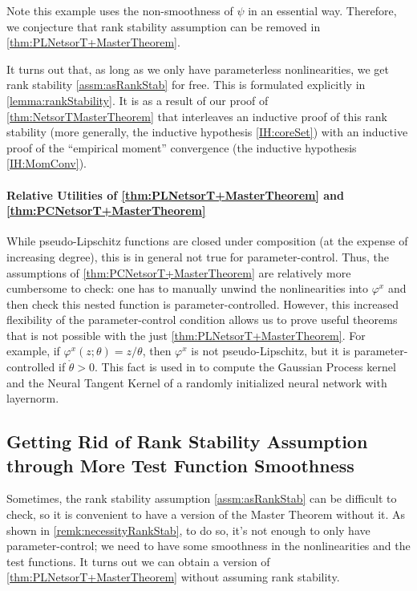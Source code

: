 \documentclass[main.tex]{subfiles}
\begin{document}
Note this example uses the non-smoothness of $\psi$ in an essential way.
Therefore, we conjecture that rank stability assumption can be removed in \cref{thm:PLNetsorT+MasterTheorem}.

\begin{rem}
 \label{remk:rankStabilityNetsor} It turns out that, as long as we only have parameterless nonlinearities, we get rank stability \cref{assm:asRankStab} for free. This is formulated explicitly in \cref{lemma:rankStability}. It is as a result of our proof of \cref{thm:NetsorTMasterTheorem} that interleaves an inductive proof of this rank stability (more generally, the inductive hypothesis \ref{IH:coreSet}) with an inductive proof of the ``empirical moment'' convergence (the inductive hypothesis \ref{IH:MomConv}). 
\end{rem}

\paragraph{Relative Utilities of \cref{thm:PLNetsorT+MasterTheorem} and \cref{thm:PCNetsorT+MasterTheorem}}
    While pseudo-Lipschitz functions are closed under composition (at the expense of increasing degree), this is in general not true for parameter-control.
    Thus, the assumptions of \cref{thm:PCNetsorT+MasterTheorem} are relatively more cumbersome to check: one has to manually unwind the nonlinearities into $\varphi^x$ and then check this nested function is parameter-controlled.
    However, this increased flexibility of the parameter-control condition allows us to prove useful theorems that is not possible with the just \cref{thm:PLNetsorT+MasterTheorem}.
    For example, if $\varphi^x(z; \theta) = z / \theta$, then $\varphi^x$ is not pseudo-Lipschitz, but it is parameter-controlled if $\mathring \theta > 0$.
    This fact is used in \citet{yangTP1,yangTP2} to compute the Gaussian Process kernel and the Neural Tangent Kernel of a randomly initialized neural network with layernorm.

\subsection{Getting Rid of Rank Stability Assumption through More Test Function Smoothness}

Sometimes, the rank stability assumption \cref{assm:asRankStab} can be difficult to check, so it is convenient to have a version of the Master Theorem without it.
As shown in \cref{remk:necessityRankStab}, to do so, it's not enough to only have parameter-control; we need to have some smoothness in the nonlinearities and the test functions.
It turns out we can obtain a version of \cref{thm:PLNetsorT+MasterTheorem} without assuming rank stability.
\end{document}
